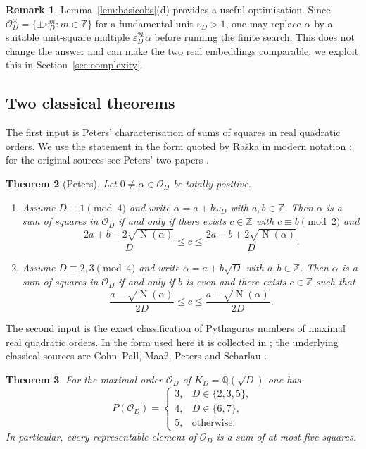 \documentclass[manuscript,screen]{acmart}
\renewcommand{\le}{\leqslant}
\theoremstyle{plain}
\newtheorem{theorem}{Theorem}[section]
\theoremstyle{definition}
\theoremstyle{nonitalicremark}
\newtheorem{remark}[theorem]{Remark}
\newcommand{\Q}{\mathbb{Q}}
\newcommand{\Z}{\mathbb{Z}}
\newcommand{\OD}{\mathcal{O}_D}
\newcommand{\wD}{\omega_D}
\newcommand{\epsD}{\varepsilon_D}
\newcommand{\Norm}{\operatorname{N}}
\begin{document}
\begin{remark}\label{rem:balancing}
Lemma~\ref{lem:basicobs}(d) provides a useful optimisation. Since
$\OD^{\times}=\{\pm \epsD^m : m \in \Z\}$ for a fundamental unit $\epsD>1$,
one may replace $\alpha$ by a suitable unit-square multiple $\epsD^{2k}\alpha$ before running the
finite search. This does not change the answer and can make the two real embeddings comparable;
we exploit this in Section~\ref{sec:complexity}.
\end{remark}

\subsection{Two classical theorems}

The first input is Peters' characterisation of sums of squares in real quadratic orders. We use the
statement in the form quoted by Ra\v ska in modern notation \cite[Theorem~7]{Raska}; for the
original sources see Peters' two papers \cite{PetersActa,PetersCrelle}.

\begin{theorem}[Peters]\label{thm:peters}
Let $0 \neq \alpha \in \OD$ be totally positive.
\begin{enumerate}[label=\textup{(\roman*)},itemsep=0.3em]
\item Assume $D\equiv 1 \pmod 4$ and write $\alpha = a+b\wD$ with $a,b\in\Z$.
Then $\alpha$ is a sum of squares in $\OD$ if and only if there exists $c\in\Z$ with
$c\equiv b \pmod 2$ and
\[
\frac{2a+b-2\sqrt{\Norm(\alpha)}}{D}
\le c \le
\frac{2a+b+2\sqrt{\Norm(\alpha)}}{D}.
\]

\item Assume $D\equiv 2,3 \pmod 4$ and write $\alpha = a+b\sqrt D$ with $a,b\in\Z$.
Then $\alpha$ is a sum of squares in $\OD$ if and only if $b$ is even and there exists
$c\in\Z$ such that
\[
\frac{a-\sqrt{\Norm(\alpha)}}{2D}
\le c \le
\frac{a+\sqrt{\Norm(\alpha)}}{2D}.
\]
\end{enumerate}
\end{theorem}

The second input is the exact classification of Pythagoras numbers of maximal real quadratic
orders. In the form used here it is collected in \cite[Theorem~3.1]{KRS}; the underlying
classical sources are Cohn--Pall, Maa\ss, Peters and Scharlau
\cite{CP,Maass,PetersCrelle,Scharlau}.

\begin{theorem}\label{thm:classification}
For the maximal order $\OD$ of $K_D = \Q(\sqrt D)$ one has
\[
P(\OD)=
\begin{cases}
3, & D\in\{2,3,5\},\\
4, & D\in\{6,7\},\\
5, & \text{otherwise.}
\end{cases}
\]
In particular, every representable element of $\OD$ is a sum of at most five squares.
\end{theorem}
\end{document}
